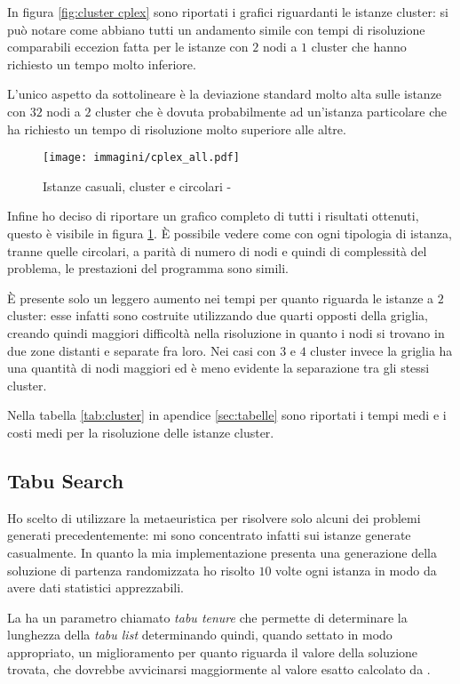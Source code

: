 In figura \ref{fig:cluster cplex} sono riportati i grafici riguardanti le istanze cluster: si può notare come abbiano tutti un andamento simile con tempi di risoluzione comparabili eccezion fatta per le istanze con $2$ nodi a $1$ cluster che hanno richiesto un tempo molto inferiore.

L'unico aspetto da sottolineare è la deviazione standard molto alta sulle istanze con $32$ nodi a $2$ cluster che è dovuta probabilmente ad un'istanza particolare che ha richiesto un tempo di risoluzione molto superiore alle altre.

\begin{figure}[htb]
	\centering
	\texttt{[image: immagini/cplex\_all.pdf]}
	\caption{Istanze casuali, cluster e circolari - }
	\label{fig:all cplex}
\end{figure}

Infine ho deciso di riportare un grafico completo di tutti i risultati ottenuti, questo è visibile in figura \ref{fig:all cplex}.
È possibile vedere come con ogni tipologia di istanza, tranne quelle circolari, a parità di numero di nodi e quindi di complessità del problema, le prestazioni del programma sono simili.

È presente solo un leggero aumento nei tempi per quanto riguarda le istanze a $2$ cluster: esse infatti sono costruite utilizzando due quarti opposti della griglia, creando quindi maggiori difficoltà nella risoluzione in quanto i nodi si trovano in due zone distanti e separate fra loro.
Nei casi con $3$ e $4$ cluster invece la griglia ha una quantità di nodi maggiori ed è meno evidente la separazione tra gli stessi cluster.

Nella tabella \ref{tab:cluster} in apendice \ref{sec:tabelle} sono riportati i tempi medi e i costi medi per la risoluzione delle istanze cluster.

\subsection{Tabu Search}

Ho scelto di utilizzare la metaeuristica \tabu per risolvere solo alcuni dei problemi generati precedentemente: mi sono concentrato infatti sui istanze generate casualmente.
In quanto la mia implementazione presenta una generazione della soluzione di partenza randomizzata ho risolto $10$ volte ogni istanza in modo da avere dati statistici apprezzabili.

La \tabu ha un parametro chiamato \emph{tabu tenure} che permette di determinare la lunghezza della \emph{tabu list} determinando quindi, quando settato in modo appropriato, un miglioramento per quanto riguarda il valore della soluzione trovata, che dovrebbe avvicinarsi maggiormente al valore esatto calcolato da .

